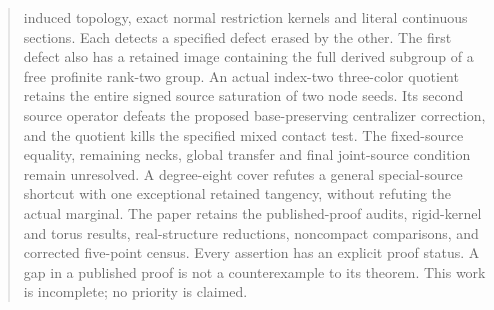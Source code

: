\documentclass[11pt,a4paper]{article}
\begin{document}
\begin{abstract}
induced topology, exact normal restriction kernels and literal
continuous sections. Each detects a specified defect erased by
the other. The first defect also has a retained image containing
the full derived subgroup of a free profinite rank-two group.
An actual index-two three-color quotient retains the entire signed
source saturation of two node seeds. Its second source operator defeats
the proposed base-preserving centralizer correction, and the quotient
kills the specified mixed contact test.
The fixed-source equality, remaining necks, global transfer and final
joint-source condition remain unresolved. A degree-eight cover refutes
a general special-source shortcut with one exceptional retained
tangency, without refuting the actual marginal. The paper retains the published-proof audits, rigid-kernel
and torus results, real-structure reductions, noncompact comparisons,
and corrected five-point census. Every assertion has an explicit proof
status. A gap in a published proof is not a counterexample to its theorem.
This work is incomplete; no priority is claimed.
\end{abstract}
\tableofcontents
\clearpage
\end{document}
